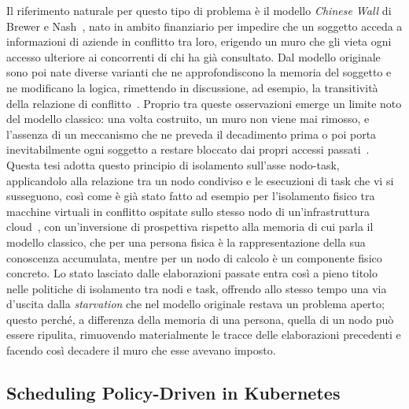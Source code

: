 Il riferimento naturale per questo tipo di problema è il modello \emph{Chinese Wall} di Brewer e Nash~\cite{chinese-wall-brewer-nash}, nato in ambito finanziario per impedire che un soggetto acceda a informazioni di aziende in conflitto tra loro, erigendo un muro che gli vieta ogni accesso ulteriore ai concorrenti di chi ha già consultato. Dal modello originale sono poi nate diverse varianti che ne approfondiscono la memoria del soggetto e ne modificano la logica, rimettendo in discussione, ad esempio, la transitività della relazione di conflitto~\cite{chinese-wall-aggressive-lin}. Proprio tra queste osservazioni emerge un limite noto del modello classico: una volta costruito, un muro non viene mai rimosso, e l'assenza di un meccanismo che ne preveda il decadimento prima o poi porta inevitabilmente ogni soggetto a restare bloccato dai propri accessi passati~\cite{chinese-wall-kessler}. Questa tesi adotta questo principio di isolamento sull'asse nodo-task, applicandolo alla relazione tra un nodo condiviso e le esecuzioni di task che vi si susseguono, così come è già stato fatto ad esempio per l'isolamento fisico tra macchine virtuali in conflitto ospitate sullo stesso nodo di un'infrastruttura cloud~\cite{chinese-wall-cloud-nodes-data}, con un'inversione di prospettiva rispetto alla memoria di cui parla il modello classico, che per una persona fisica è la rappresentazione della sua conoscenza accumulata, mentre per un nodo di calcolo è un componente fisico concreto. Lo stato lasciato dalle elaborazioni passate entra così a pieno titolo nelle politiche di isolamento tra nodi e task, offrendo allo stesso tempo una via d'uscita dalla \emph{starvation} che nel modello originale restava un problema aperto; questo perché, a differenza della memoria di una persona, quella di un nodo può essere ripulita, rimuovendo materialmente le tracce delle elaborazioni precedenti e facendo così decadere il muro che esse avevano imposto.


\subsection{Scheduling Policy-Driven in Kubernetes}
\label{subsec:k8s_correlati}


